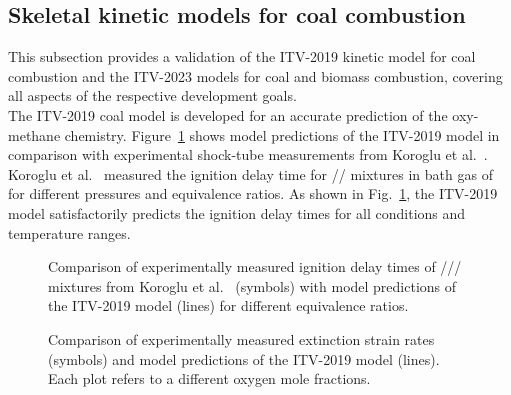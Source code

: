 \begin{refsection}
\subsection{Skeletal kinetic models for coal combustion}

This subsection provides a validation of the ITV-2019 kinetic model for coal combustion and the ITV-2023 models for coal and biomass combustion, covering all aspects of the respective development goals.
\\
The ITV-2019 coal model is developed for an accurate prediction of the oxy-methane chemistry. Figure~\ref{fig:B1bIDTLimingCaiCoalMechanism} shows model predictions of the ITV-2019 model in comparison with experimental shock-tube measurements from Koroglu et al.~\cite{Koroglu2016}. Koroglu et al.~\cite{Koroglu2016} measured the ignition delay time for // mixtures in bath gas of  for different pressures and equivalence ratios. As shown in Fig.~\ref{fig:B1bIDTLimingCaiCoalMechanism}, the ITV-2019 model satisfactorily predicts the ignition delay times for all conditions and temperature ranges.
\begin{figure}[h]
  \centering
  \hfill
  \hfill
  \caption{Comparison of experimentally measured ignition delay times of /// mixtures from Koroglu et al.~\cite{Koroglu2016} (symbols) with model predictions of the ITV-2019 model (lines) for different equivalence ratios.}
  \label{fig:B1bIDTLimingCaiCoalMechanism}
\end{figure}
\begin{figure}[t]
  \centering
  \hfill
  \hfill
  \caption{Comparison of experimentally measured extinction strain rates (symbols) and model predictions of the ITV-2019 model (lines). Each plot refers to a different oxygen mole fractions.}
  \label{fig:B1bExtStrainRateLimingCaiCoalMechanism}
\end{figure}

\end{refsection}
